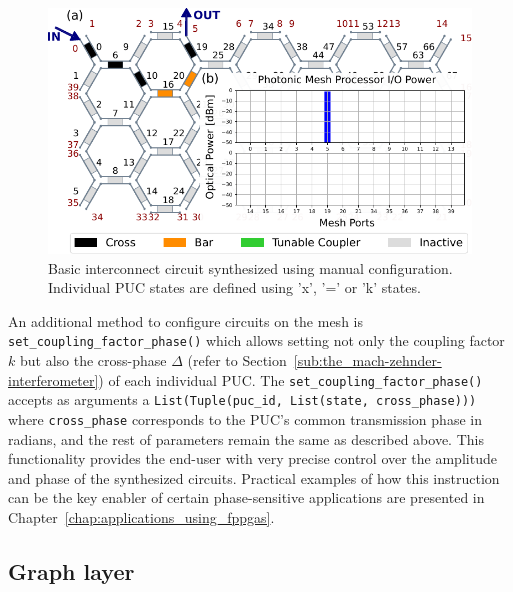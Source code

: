\begin{figure}[h]
	\begin{center}
		\includegraphics{figures/ch2-sw-synthesis.pdf}
	\end{center}
	\caption{Basic interconnect circuit synthesized using manual configuration.
		Individual PUC states are defined using 'x', '=' or 'k' states.
	}\label{fig:ch2-sw-synthesis}
\end{figure}

An additional method to configure circuits on the mesh is \lstinline|set_coupling_factor_phase()| which allows setting not only the coupling factor \(k\) but also the cross-phase \(\Delta\) (refer to Section~\ref{sub:the_mach-zehnder-interferometer}) of each individual PUC.
The \lstinline|set_coupling_factor_phase()| accepts as arguments a \lstinline|List(Tuple(puc_id, List(state, cross_phase)))| where \lstinline|cross_phase| corresponds to the PUC's common transmission phase in radians, and the rest of parameters remain the same as described above.
This functionality provides the end-user with very precise control over the amplitude and phase of the synthesized circuits.
Practical examples of how this instruction can be the key enabler of certain phase-sensitive applications are presented in Chapter~\ref{chap:applications_using_fppgas}.

\subsection{Graph layer}\label{sub:graph_layer}

